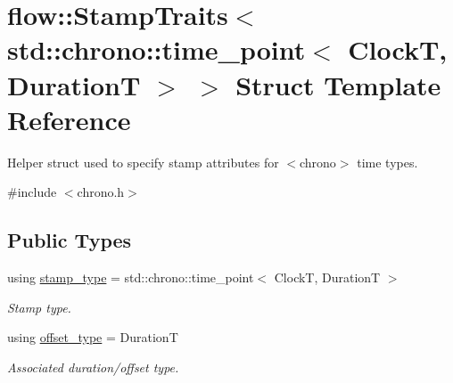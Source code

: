 \hypertarget{structflow_1_1_stamp_traits_3_01std_1_1chrono_1_1time__point_3_01_clock_t_00_01_duration_t_01_4_01_4}{}\section{flow\+:\+:Stamp\+Traits$<$ std\+:\+:chrono\+:\+:time\+\_\+point$<$ ClockT, DurationT $>$ $>$ Struct Template Reference}
\label{structflow_1_1_stamp_traits_3_01std_1_1chrono_1_1time__point_3_01_clock_t_00_01_duration_t_01_4_01_4}


Helper struct used to specify stamp attributes for $<$chrono$>$ time types.  




{\ttfamily \#include $<$chrono.\+h$>$}

\subsection*{Public Types}
\begin{DoxyCompactItemize}
\item 
\mbox{\label{structflow_1_1_stamp_traits_3_01std_1_1chrono_1_1time__point_3_01_clock_t_00_01_duration_t_01_4_01_4_a06904e1c3115b03be761eba0d6b3e319}} 
using \hyperlink{structflow_1_1_stamp_traits_3_01std_1_1chrono_1_1time__point_3_01_clock_t_00_01_duration_t_01_4_01_4_a06904e1c3115b03be761eba0d6b3e319}{stamp\+\_\+type} = std\+::chrono\+::time\+\_\+point$<$ ClockT, DurationT $>$
\begin{DoxyCompactList}\small\item\em Stamp type. \end{DoxyCompactList}\item 
\mbox{\label{structflow_1_1_stamp_traits_3_01std_1_1chrono_1_1time__point_3_01_clock_t_00_01_duration_t_01_4_01_4_ac09d74296cf6de0a4b161f1e728fae41}} 
using \hyperlink{structflow_1_1_stamp_traits_3_01std_1_1chrono_1_1time__point_3_01_clock_t_00_01_duration_t_01_4_01_4_ac09d74296cf6de0a4b161f1e728fae41}{offset\+\_\+type} = DurationT
\begin{DoxyCompactList}\small\item\em Associated duration/offset type. \end{DoxyCompactList}\end{DoxyCompactItemize}
